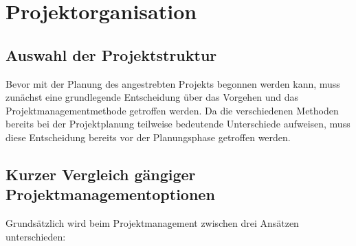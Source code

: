 \section{Projektorganisation}

\subsection{Auswahl der Projektstruktur}

Bevor mit der Planung des angestrebten Projekts begonnen werden kann, muss zunächst eine grundlegende Entscheidung über das Vorgehen und das Projektmanagementmethode getroffen werden. Da die verschiedenen Methoden bereits bei der Projektplanung teilweise bedeutende Unterschiede aufweisen, muss diese Entscheidung bereits vor der Planungsphase getroffen werden.

\subsection{Kurzer Vergleich gängiger Projektmanagementoptionen}
\label{subsec:pmstrukturen}

Grundsätzlich wird beim Projektmanagement zwischen drei Ansätzen unterschieden:\\

